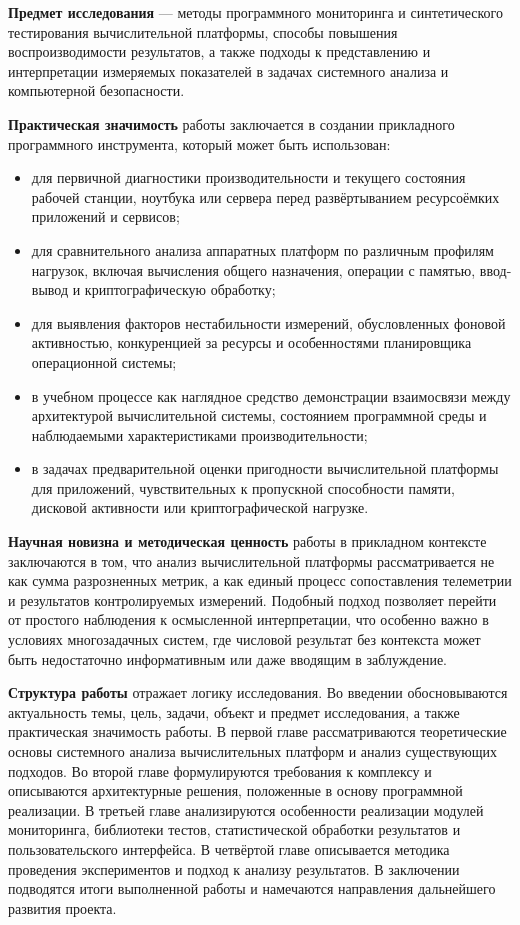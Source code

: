 \textbf{Предмет исследования} --- методы программного мониторинга и синтетического тестирования вычислительной платформы, способы повышения воспроизводимости результатов, а также подходы к представлению и интерпретации измеряемых показателей в задачах системного анализа и компьютерной безопасности.

\textbf{Практическая значимость} работы заключается в создании прикладного программного инструмента, который может быть использован:
\begin{itemize}
    \item для первичной диагностики производительности и текущего состояния рабочей станции, ноутбука или сервера перед развёртыванием ресурсоёмких приложений и сервисов;
    \item для сравнительного анализа аппаратных платформ по различным профилям нагрузок, включая вычисления общего назначения, операции с памятью, ввод-вывод и криптографическую обработку;
    \item для выявления факторов нестабильности измерений, обусловленных фоновой активностью, конкуренцией за ресурсы и особенностями планировщика операционной системы;
    \item в учебном процессе как наглядное средство демонстрации взаимосвязи между архитектурой вычислительной системы, состоянием программной среды и наблюдаемыми характеристиками производительности;
    \item в задачах предварительной оценки пригодности вычислительной платформы для приложений, чувствительных к пропускной способности памяти, дисковой активности или криптографической нагрузке.
\end{itemize}

\textbf{Научная новизна и методическая ценность} работы в прикладном контексте заключаются в том, что анализ вычислительной платформы рассматривается не как сумма разрозненных метрик, а как единый процесс сопоставления телеметрии и результатов контролируемых измерений. Подобный подход позволяет перейти от простого наблюдения к осмысленной интерпретации, что особенно важно в условиях многозадачных систем, где числовой результат без контекста может быть недостаточно информативным или даже вводящим в заблуждение.

\textbf{Структура работы} отражает логику исследования. Во введении обосновываются актуальность темы, цель, задачи, объект и предмет исследования, а также практическая значимость работы. В первой главе рассматриваются теоретические основы системного анализа вычислительных платформ и анализ существующих подходов. Во второй главе формулируются требования к комплексу и описываются архитектурные решения, положенные в основу программной реализации. В третьей главе анализируются особенности реализации модулей мониторинга, библиотеки тестов, статистической обработки результатов и пользовательского интерфейса. В четвёртой главе описывается методика проведения экспериментов и подход к анализу результатов. В заключении подводятся итоги выполненной работы и намечаются направления дальнейшего развития проекта.

